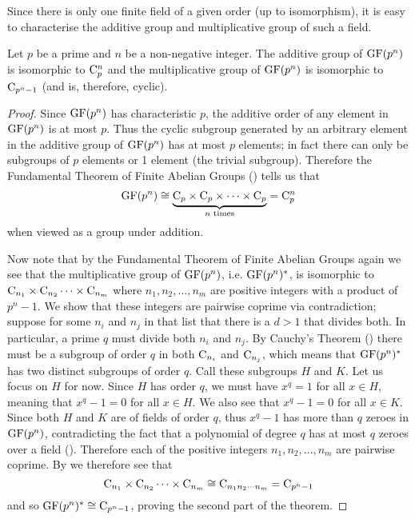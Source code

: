 Since there is only one finite field of a given order (up to isomorphism), it is easy to characterise the additive group and multiplicative group of such a field.

\begin{theorem}\label{thrm-structure-of-finite-field}
    Let $p$ be a prime and $n$ be a non-negative integer. The additive group of $\mathrm{GF}(p^n)$ is isomorphic to $\mathrm{C}_{p}^n$ and the multiplicative group of $\mathrm{GF}(p^n)$ is isomorphic to $\mathrm{C}_{p^n-1}$ (and is, therefore, cyclic).
\end{theorem}
\begin{proof}
    Since $\mathrm{GF}(p^n)$ has characteristic $p$, the additive order of any element in $\mathrm{GF}(p^n)$ is at most $p$. Thus the cyclic subgroup generated by an arbitrary element in the additive group of $\mathrm{GF}(p^n)$ has at most $p$ elements; in fact there can only be subgroups of $p$ elements or 1 element (the trivial subgroup). Therefore the Fundamental Theorem of Finite Abelian Groups () tells us that
    \[
        \mathrm{GF}(p^n) \cong \underbrace{\mathrm{C}_{p} \times \mathrm{C}_{p} \times \cdots \times \mathrm{C}_{p}}_{n\text{ times}} = \mathrm{C}_{p}^n
    \]
    when viewed as a group under addition.

    Now note that by the Fundamental Theorem of Finite Abelian Groups again we see that the multiplicative group of $\mathrm{GF}(p^n)$, i.e. $\mathrm{GF}(p^n)^\ast$, is isomorphic to $\mathrm{C}_{n_1}\times\mathrm{C}_{n_2}\cdots\times\mathrm{C}_{n_m}$ where $n_1, n_2, \dots, n_m$ are positive integers with a product of $p^n - 1$. We show that these integers are pairwise coprime via contradiction; suppose for some $n_i$ and $n_j$ in that list that there is a $d > 1$ that divides both. In particular, a prime $q$ must divide both $n_i$ and $n_j$. By Cauchy's Theorem () there must be a subgroup of order $q$ in both $\mathrm{C}_{n_i}$ and $\mathrm{C}_{n_j}$, which means that $\mathrm{GF}(p^n)^\ast$ has two distinct subgroups of order $q$. Call these subgroups $H$ and $K$. Let us focus on $H$ for now. Since $H$ has order $q$, we must have $x^q = 1$ for all $x \in H$, meaning that $x^q - 1 = 0$ for all $x \in H$. We also see that $x^q - 1 = 0$ for all $x \in K$. Since both $H$ and $K$ are of fields of order $q$, thus $x^q - 1$ has more than $q$ zeroes in $\mathrm{GF}(p^n)$, contradicting the fact that a polynomial of degree $q$ has at most $q$ zeroes over a field (). Therefore each of the positive integers $n_1, n_2, \dots, n_m$ are pairwise coprime. By  we therefore see that
    \[
        \mathrm{C}_{n_1}\times\mathrm{C}_{n_2}\cdots\times\mathrm{C}_{n_m} \cong \mathrm{C}_{n_1n_2\cdots n_m} = \mathrm{C}_{p^n-1}
    \]
    and so $\mathrm{GF}(p^n)^\ast \cong \mathrm{C}_{p^n-1}$, proving the second part of the theorem.
\end{proof}

